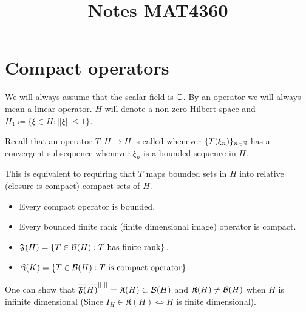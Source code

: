 \documentclass[10pt,english,a4paper]{article}
\title{Notes MAT4360}
\theoremstyle{definition}
\let\emph\relax %
\def\Ff{\mathfrak{F}}
\def\Kf{\mathfrak{K}}
\begin{document}
\maketitle

\section{Compact operators}
We will always assume that the scalar field is $\mathbb{C}$. By an operator we will always 
mean a linear operator. $H$ will denote a non-zero Hilbert space and 
$H_1 \coloneqq \{ \xi \in H : ||\xi||\leq 1 \}$.

Recall that an operator $T \colon H \to H$ is called \emph{compact} whenever 
$\{T(\xi_n)\}_{n \in \mathbb{N}}$ has a convergent subsequence whenever $\xi_n$ is 
a bounded sequence in $H$.

This is equivalent to requiring that $T$ maps bounded sets in $H$ into relative
(closure is compact) compact sets of $H$.

\begin{itemize}
    \item Every compact operator is bounded. 
    \item Every bounded finite rank (finite dimensional image) operator is compact.
    \item $\Ff(H) = \{ T \in \Bs(H): T \text{ has finite rank} \}$. 
    \item $\Kf(K) = \{T \in \Bs(H) : T \text{ is compact operator}\}$.
\end{itemize}
One can show that $\ol{\Ff(H)}^{||\cdot||} = \Kf(H) \subset \Bs(H)$ 
and $\Kf(H) \neq \Bs(H)$ when $H$ is infinite dimensional (Since $I_{H} \in
\Kf(H) \iff H$ is finite dimensional). 
\end{document}
